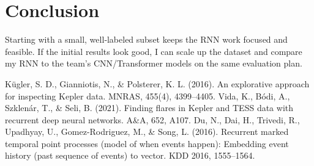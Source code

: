 \documentclass[letterpaper]{article}
\begin{document}
\section{Conclusion}
Starting with a small, well‑labeled subset keeps the RNN work focused and feasible. If the initial results look good, I can scale up the dataset and compare my RNN to the team’s CNN/Transformer models on the same evaluation plan.

\begin{thebibliography}{99}
 Kügler, S. D., Gianniotis, N., \& Polsterer, K. L. (2016). An explorative approach for inspecting Kepler data. MNRAS, 455(4), 4399–4405.
 Vida, K., Bódi, A., Szklenár, T., \& Seli, B. (2021). Finding flares in Kepler and TESS data with recurrent deep neural networks. A\&A, 652, A107.
 Du, N., Dai, H., Trivedi, R., Upadhyay, U., Gomez-Rodriguez, M., \& Song, L. (2016). Recurrent marked temporal point processes (model of when events happen): Embedding event history (past sequence of events) to vector. KDD 2016, 1555–1564.
\end{thebibliography}
\end{document}
